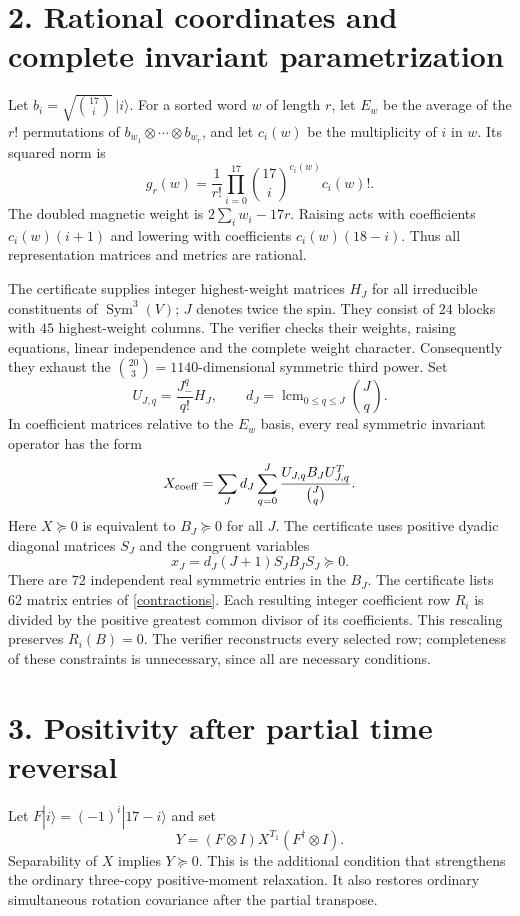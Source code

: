 \documentclass[11pt]{article}
\begin{document}
\section*{2. Rational coordinates and complete invariant parametrization}
Let $b_i=\sqrt{\binom{17}{i}}\,|i\rangle$.
For a sorted word $w$ of length $r$, let $E_w$ be the average of the $r!$
permutations of $b_{w_1}\otimes\cdots\otimes b_{w_r}$, and let $c_i(w)$
be the multiplicity of $i$ in $w$. Its squared norm is
\[
 g_r(w)=\frac1{r!}\prod_{i=0}^{17}
          \binom{17}{i}^{c_i(w)}c_i(w)!.
\]
The doubled magnetic weight is $2\sum_iw_i-17r$.
Raising acts with coefficients $c_i(w)(i+1)$ and lowering with coefficients
$c_i(w)(18-i)$. Thus all representation matrices and metrics are rational.

The certificate supplies integer highest-weight matrices $H_J$ for all
irreducible constituents of $\operatorname{Sym}^{3}(V)$; $J$ denotes twice
the spin. They consist of $24$ blocks with $45$ highest-weight columns.
The verifier checks their weights, raising equations, linear independence
and the complete weight character. Consequently they exhaust the
$\binom{20}{3}=1140$-dimensional symmetric third power.
Set
\[
 U_{J,q}=\frac{J_-^{q}}{q!}H_J,\qquad
 d_J=\operatorname{lcm}_{0\leq q\leq J}\binom Jq.
\]
In coefficient matrices relative to the $E_w$ basis, every real symmetric
invariant operator has the form
\begin{equation}\label{decomposition}
 X_{\rm coeff}=\sum_J d_J\sum_{q=0}^{J}
 \frac{U_{J,q}B_JU_{J,q}^{T}}{\binom Jq}.
\end{equation}
Here $X\succeq0$ is equivalent to $B_J\succeq0$ for all $J$.
The certificate uses positive dyadic diagonal matrices $S_J$ and the
congruent variables
\[
 x_J=d_J(J+1)S_JB_JS_J\succeq0.
\]
There are $72$ independent real symmetric entries in the $B_J$.
The certificate lists $62$ matrix entries of \eqref{contractions}.
Each resulting integer coefficient row $R_i$ is divided by the positive
greatest common divisor of its coefficients. This rescaling preserves
$R_i(B)=0$. The verifier reconstructs every selected row; completeness of
these constraints is unnecessary, since all are necessary conditions.

\section*{3. Positivity after partial time reversal}
Let $F|i\rangle=(-1)^i|17-i\rangle$ and set
\[
 Y=(F\otimes I)X^{T_1}(F^\dagger\otimes I).
\]
Separability of $X$ implies $Y\succeq0$. This is the additional condition
that strengthens the ordinary three-copy positive-moment relaxation.
It also restores ordinary simultaneous rotation covariance after the
partial transpose.
\end{document}
